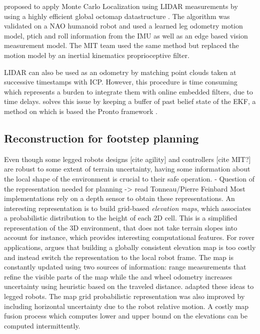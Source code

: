  
\cite{hornung2014monte} proposed to apply Monte Carlo Localization using LIDAR measurements by using a highly efficient global octomap datastructure \cite{hornung2013octomap}.
The algorithm was validated on a NAO humanoid robot and used a learned leg odometry motion model, ptich and roll information from the IMU as well as an edge based vision measurement model.
The MIT team \cite{fallon2014drift} used the same method but replaced the motion model by an inertial kinematics proprioceptive filter. 

LIDAR can also be used as an odometry by matching point clouds taken at successive timestamps with ICP. However, this procedure is time consuming 
which represents a burden to integrate them with online embedded filters, due to time delays. \cite{nobili2017heterogeneous} solves this issue by keeping a
buffer of past belief state of the EKF, a method on which is based the Pronto framework \cite{camurri2020pronto}.




\subsection{Reconstruction for footstep planning}
Even though some legged robots designs [cite agility] and controllers [cite MIT?] are robust to some extent of terrain uncertainty, having some information about the local
shape of the environment is crucial to their safe operation. 
- Question of the representation needed for planning -> read Tonneau/Pierre Feinbard
Most implementations rely on a depth sensor to obtain these representations. 
An interesting representation is to build grid-based \textit{elevation maps}, which associates a probabilistic distribution to the height of each 2D cell. 
This is a simplified representation of the 3D environment, that does not take terrain slopes into account for instance, which provides interesting computational features. 
For rover applications, \cite{kleiner2007real} argues that building a globally consistent elevation map is too costly and instead switch the representation to the local robot frame. 
The map is constantly updated using two sources of information: range measurements that refine the visible parts of the map while the and wheel odometry increases uncertainty using heuristic
based on the traveled distance. \cite{fankhauser2014robot, fankhauser2018probabilistic} adapted these ideas to legged robots. The map grid probabilistic representation
was also improved by including horizontal uncertainty due to the robot relative motion. A costly map fusion process which computes lower and upper bound on the elevations
can be computed intermittently. 

